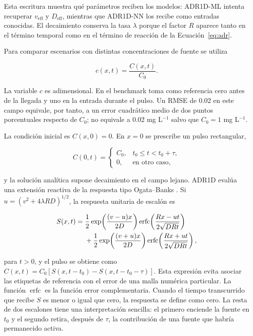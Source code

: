 \documentclass[11pt,a4paper]{article}
\begin{document}
Esta escritura muestra qué parámetros reciben los modelos: ADR1D-ML intenta
recuperar $v_{\mathrm{eff}}$ y $D_{\mathrm{eff}}$, mientras que ADR1D-NN los
recibe como entradas conocidas. El decaimiento conserva la tasa $\lambda$
porque el factor $R$ aparece tanto en el término temporal como en el término de
reacción de la Ecuación~\eqref{eq:adr}.

Para comparar escenarios con distintas concentraciones de fuente se utiliza

\begin{equation}
c(x,t)=\frac{C(x,t)}{C_0}.
\label{eq:normalized-concentration}
\end{equation}

La variable $c$ es adimensional. En el benchmark toma como referencia cero
antes de la llegada y uno en la entrada durante el pulso. Un RMSE de 0.02 en
este campo equivale, por tanto, a un error cuadrático medio de dos puntos
porcentuales respecto de $C_0$; no equivale a 0.02 mg L$^{-1}$ salvo que
$C_0=1$ mg L$^{-1}$.

La condición inicial es $C(x,0)=0$. En $x=0$ se prescribe un pulso rectangular,

\begin{equation}
C(0,t)=
\begin{cases}
C_0, & t_0\leq t<t_0+\tau,\\
0, & \text{en otro caso},
\end{cases}
\end{equation}

y la solución analítica supone decaimiento en el campo lejano. ADR1D evalúa una
extensión reactiva de la respuesta tipo Ogata--Banks
\cite{ogata1961,chen2011}. Si
$u=(v^2+4\lambda R D)^{1/2}$, la respuesta unitaria de escalón es

\begin{align}
S(x,t)={}&\frac{1}{2}\exp\!\left(\frac{(v-u)x}{2D}\right)
\operatorname{erfc}\!\left(\frac{Rx-ut}{2\sqrt{DRt}}\right)\notag\\
&+\frac{1}{2}\exp\!\left(\frac{(v+u)x}{2D}\right)
\operatorname{erfc}\!\left(\frac{Rx+ut}{2\sqrt{DRt}}\right),
\end{align}

para $t>0$, y el pulso se obtiene como
$C(x,t)=C_0[S(x,t-t_0)-S(x,t-t_0-\tau)]$. Esta expresión evita asociar las
etiquetas de referencia con el error de una malla numérica particular. La
función $\operatorname{erfc}$ es la función error complementaria. Cuando el
tiempo transcurrido que recibe $S$ es menor o igual que cero, la respuesta se
define como cero. La resta de dos escalones tiene una interpretación sencilla:
el primero enciende la fuente en $t_0$ y el segundo retira, después de $\tau$,
la contribución de una fuente que habría permanecido activa.
\end{document}
